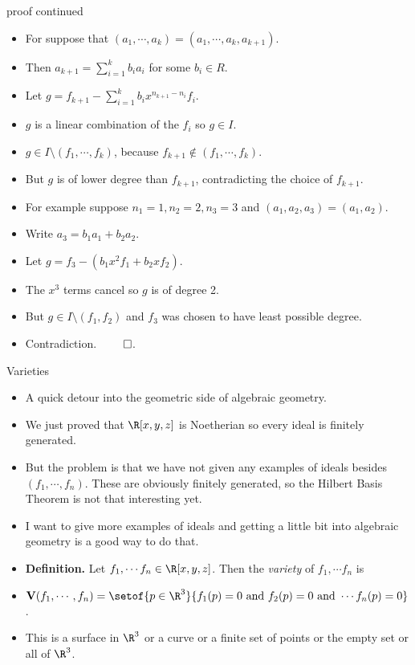 \documentclass{beamer}
\begin{document}

\begin{frame}{proof continued}

\begin{itemize}
  \item For suppose that $(a_1,\cdots, a_k) = (a_1,\cdots, a_k, a_{k+1})$.
  \item Then $a_{k+1} = \sum_{i=1}^k b_i a_i$ for some $b_i\in R$.
  \item Let $g=f_{k+1} - \sum_{i=1}^kb_i x^{n_{k+1} - n_i} f_i$.
  \item $g$ is a linear combination of the $f_i$ so $g\in I$.
  \item $g \in I \setminus (f_1,\cdots,f_k)$, because $f_{k+1} \notin (f_1,\cdots,f_k)$.
  \item But $g$ is of
  lower degree than $f_{k+1}$, contradicting the choice of $f_{k+1}$.
  \item For example suppose $n_1 = 1, n_2 =2, n_3 = 3$ and $(a_1,a_2,a_3) = (a_1, a_2)$.
  \item Write $a_3 = b_1 a_1 + b_2 a_2$.
  \item Let $g=f_3 - (b_1 x^2 f_1 + b_2 x f_2)$.
  \item The $x^3$ terms cancel so $g$ is of degree 2.
  \item But $g \in I \setminus (f_1, f_2)$ and $f_3$ was chosen to have least possible degree.
  \item Contradiction. $\qed$.
\end{itemize}
\end{frame}


\begin{frame}{Varieties}

\begin{itemize}
  \item A quick detour into the geometric side of algebraic geometry.
  \item We just proved that $\R[x,y,z]$ is Noetherian so every ideal is finitely generated.
  \item But the problem is that we have not given any examples of ideals besides $(f_1,\cdots, f_n)$. These are obviously finitely generated,
  so the Hilbert Basis Theorem is not that interesting yet.
  \item I want to give more examples of ideals and getting a little bit into algebraic geometry is a good way to do that.
  \item \textbf{Definition.} Let $f_1,\cdots f_n \in \R[x,y,z]$. Then the \emph{variety} of $f_1,\cdots f_n$ is
  \item $\mathbf{V}(f_1,\cdots,f_n) = \setof{p\in\R^3}{f_1(p)=0 \text{ and } f_2(p)=0 \text{ and } \cdots f_n(p)=0}$.
  \item This is a surface in $\R^3$ or a curve or a finite set of points or the empty set or all of $\R^3$.
\end{itemize}
\end{frame}
\end{document}
